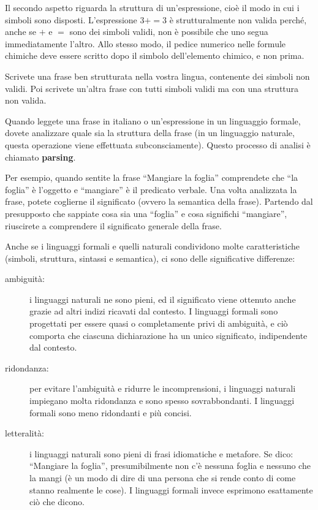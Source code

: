\documentclass[10pt]{book}
\begin{document}
Il secondo aspetto riguarda la struttura di un'espressione, cioè il modo in cui i simboli sono disposti. L'espressione
$3 + = 3$ è strutturalmente non valida perché, anche se $+$ e $=$ sono dei simboli validi, non è possibile che uno segua immediatamente l'altro. Allo stesso modo, il pedice numerico nelle formule chimiche deve essere scritto dopo il simbolo dell'elemento chimico, e non prima.

\begin{exercise}

Scrivete una frase ben strutturata nella vostra lingua, contenente dei simboli non validi. Poi scrivete un'altra frase con tutti simboli validi ma con una struttura non valida.

\end{exercise}

Quando leggete una frase in italiano o un'espressione in un linguaggio formale, dovete analizzare quale sia la struttura della frase (in un linguaggio naturale, questa operazione viene effettuata subconsciamente). Questo processo di analisi è chiamato {\bf parsing}.

Per esempio, quando sentite la frase ``Mangiare la foglia'' comprendete che ``la foglia'' è l'oggetto e ``mangiare'' è il predicato verbale.  Una volta   analizzata la frase, potete coglierne il significato (ovvero la semantica della frase). Partendo dal presupposto che sappiate cosa sia una ``foglia'' e cosa significhi ``mangiare'', riuscirete a comprendere il significato generale della frase.

Anche se i linguaggi formali e quelli naturali condividono molte    caratteristiche (simboli, struttura, sintassi e semantica), ci sono delle   significative differenze:

\begin{description}

\item[ambiguità:] i linguaggi naturali ne sono pieni, ed il significato viene   ottenuto anche grazie ad altri indizi ricavati dal contesto. I linguaggi formali sono progettati per essere quasi o completamente privi di ambiguità, e ciò comporta che ciascuna dichiarazione ha un unico significato, indipendente dal contesto.

\item[ridondanza:] per evitare l'ambiguità e ridurre le incomprensioni, i linguaggi naturali impiegano molta ridondanza e sono spesso sovrabbondanti. I linguaggi formali sono meno ridondanti e più concisi.

\item[letteralità:] i linguaggi naturali sono pieni di frasi idiomatiche e metafore. Se dico: ``Mangiare la foglia'', presumibilmente non c'è nessuna foglia e nessuno che la mangi (è un modo di dire di una persona che si rende conto di come stanno realmente le cose). I linguaggi formali invece esprimono esattamente ciò che dicono.

\end{description}
\end{document}
